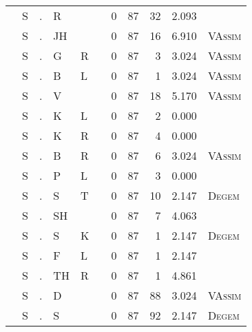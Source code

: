 \begin{longtable}{r@{ } r@{ } c@{ } l@{ } l@{ } l@{ } r r r r l }
 & S & . & R &  &  & 0 & 87 & 32 & 2.093 &  \\
 & S & . & JH &  &  & 0 & 87 & 16 & 6.910 & \textsc{VAssim} \\
 & S & . & G & R &  & 0 & 87 & 3 & 3.024 & \textsc{VAssim} \\
 & S & . & B & L &  & 0 & 87 & 1 & 3.024 & \textsc{VAssim} \\
 & S & . & V &  &  & 0 & 87 & 18 & 5.170 & \textsc{VAssim} \\
 & S & . & K & L &  & 0 & 87 & 2 & 0.000 &  \\
 & S & . & K & R &  & 0 & 87 & 4 & 0.000 &  \\
 & S & . & B & R &  & 0 & 87 & 6 & 3.024 & \textsc{VAssim} \\
 & S & . & P & L &  & 0 & 87 & 3 & 0.000 &  \\
 & S & . & S & T &  & 0 & 87 & 10 & 2.147 & \textsc{Degem} \\
 & S & . & SH &  &  & 0 & 87 & 7 & 4.063 &  \\
 & S & . & S & K &  & 0 & 87 & 1 & 2.147 & \textsc{Degem} \\
 & S & . & F & L &  & 0 & 87 & 1 & 2.147 &  \\
 & S & . & TH & R &  & 0 & 87 & 1 & 4.861 &  \\
 & S & . & D &  &  & 0 & 87 & 88 & 3.024 & \textsc{VAssim} \\
 & S & . & S &  &  & 0 & 87 & 92 & 2.147 & \textsc{Degem} \\
\bottomrule
\end{longtable}
